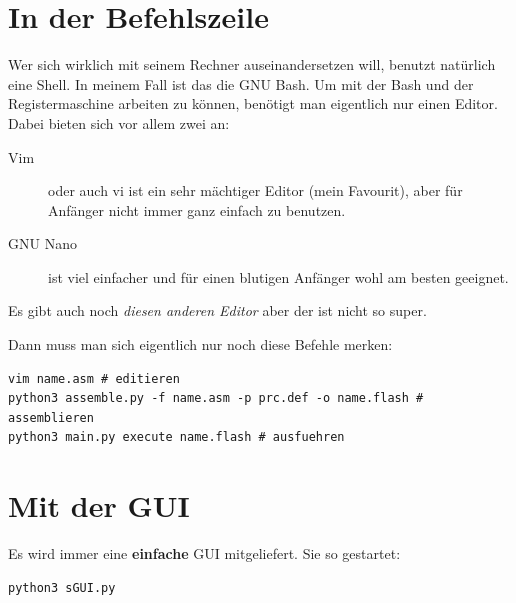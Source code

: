 \documentclass[a4paper,12pt,oneside]{scrreprt}
\begin{document}
\section{In der Befehlszeile}

Wer sich wirklich mit seinem Rechner auseinandersetzen will, benutzt natürlich eine Shell. In meinem Fall ist das die GNU Bash.  
Um mit der Bash und der Registermaschine arbeiten zu können, benötigt man eigentlich nur einen Editor. Dabei bieten sich vor allem zwei an:

\begin{description}

\item[Vim] oder auch vi ist ein sehr mächtiger Editor (mein Favourit), aber für Anfänger nicht immer ganz einfach zu benutzen.

\item[GNU Nano] ist viel einfacher und für einen blutigen Anfänger wohl am besten geeignet.

\end{description}

Es gibt auch noch \textit{diesen anderen Editor} aber der ist nicht so super.

Dann muss man sich eigentlich nur noch diese Befehle merken:

\begin{lstlisting}
vim name.asm # editieren
python3 assemble.py -f name.asm -p prc.def -o name.flash # assemblieren
python3 main.py execute name.flash # ausfuehren
\end{lstlisting}

\section{Mit der GUI}

Es wird immer eine \textbf{einfache} GUI mitgeliefert.
Sie so gestartet:

\begin{lstlisting}
python3 sGUI.py
\end{lstlisting}
\end{document}
